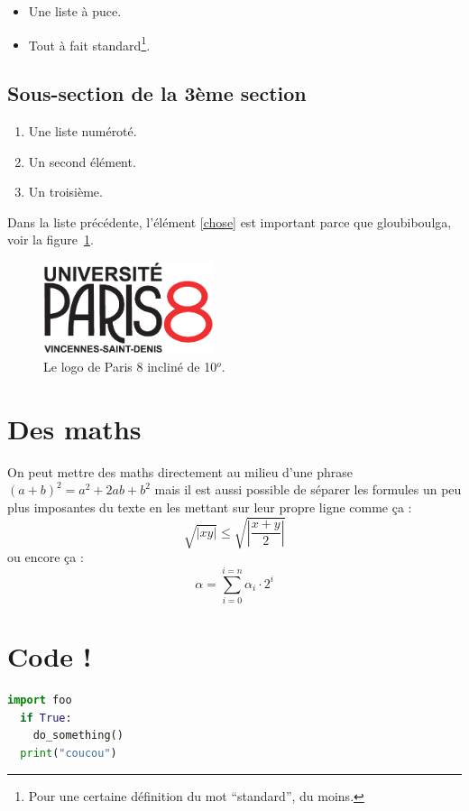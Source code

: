 \documentclass{article}
\begin{document}
\begin{itemize}
\item Une liste à puce.
\item Tout à fait standard\footnote{Pour une certaine définition du mot ``standard'', du moins.}.
\end{itemize}

\subsection{Sous-section de la 3ème section}

\begin{enumerate}
\item Une liste numéroté.
\item Un second élément.
\item \label{chose} Un troisième.
\end{enumerate}

Dans la liste précédente, l'élément \ref{chose} est important parce que gloubiboulga, voir la figure~\ref{fig:p8}.

\begin{figure}
  \centering
  \includegraphics[width=5cm,angle=10]{p8.pdf}
  \caption{Le logo de Paris 8 incliné de 10$^o$. \label{fig:p8}}
\end{figure}

\section{Des maths}
On peut mettre des maths directement au milieu d'une phrase
$(a+b)^2 = a^2 + 2ab + b^2$ mais il est aussi possible de séparer
les formules un peu plus imposantes du texte en les mettant sur
leur propre ligne comme ça :
\[
  \sqrt{|xy|}\leq\sqrt{\left|\frac{x+y}{2}\right|}
\]
ou encore ça :
\[
  \alpha = \sum_{i=0}^{i=n} \alpha_i \cdot 2^i
\]

\section{Code !}

\begin{lstlisting}[language=python]
  import foo
  if True:
    do_something()
  print("coucou")
\end{lstlisting}
\end{document}
